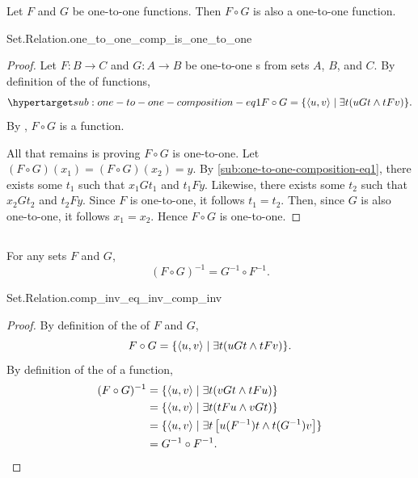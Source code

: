 \documentclass{report}
\begin{document}
  \begin{lemma}
    Let $F$ and $G$ be one-to-one functions.
    Then $F \circ G$ is also a one-to-one function.
  \end{lemma}

    {Set.Relation.one\_to\_one\_comp\_is\_one\_to\_one}

  \begin{proof}
    Let $F \colon B \rightarrow C$ and $G \colon A \rightarrow B$ be
      one-to-one s from sets $A$, $B$, and $C$.
    By definition of the  of functions,
      \begin{equation}
        \hyperlabel{sub:one-to-one-composition-eq1}
        F \circ G = \{\tuple{u, v} \mid \exists t(uGt \land tFv)\}.
      \end{equation}
    By , $F \circ G$ is a function.

    All that remains is proving $F \circ G$ is one-to-one.
    Let $(F \circ G)(x_1) = (F \circ G)(x_2) = y$.
    By \eqref{sub:one-to-one-composition-eq1}, there exists some $t_1$ such that
      $x_1Gt_1$ and $t_1Fy$.
    Likewise, there exists some $t_2$ such that $x_2Gt_2$ and $t_2Fy$.
    Since $F$ is one-to-one, it follows $t_1 = t_2$.
    Then, since $G$ is also one-to-one, it follows $x_1 = x_2$.
    Hence $F \circ G$ is one-to-one.
  \end{proof}

\subsection{}%

  \begin{theorem}[3I]
    For any sets $F$ and $G$, $$(F \circ G)^{-1} = G^{-1} \circ F^{-1}.$$
  \end{theorem}

    {Set.Relation.comp\_inv\_eq\_inv\_comp\_inv}

  \begin{proof}
    By definition of the  of $F$ and $G$,
      $$F \circ G = \{\left< u, v \right> \mid \exists t(uGt \land tFv)\}.$$
    By definition of the  of a function,
      \begin{align*}
        (F \circ G)^{-1}
          & = \{\left< u, v \right> \mid \exists t (vGt \land tFu)\} \\
          & = \{\left< u, v \right> \mid \exists t (tFu \land vGt)\} \\
          & = \{\left< u, v \right> \mid
            \exists t \left[ u(F^{-1})t \land t(G^{-1})v \right]\} \\
          & = G^{-1} \circ F^{-1}.
      \end{align*}
  \end{proof}
\end{document}
